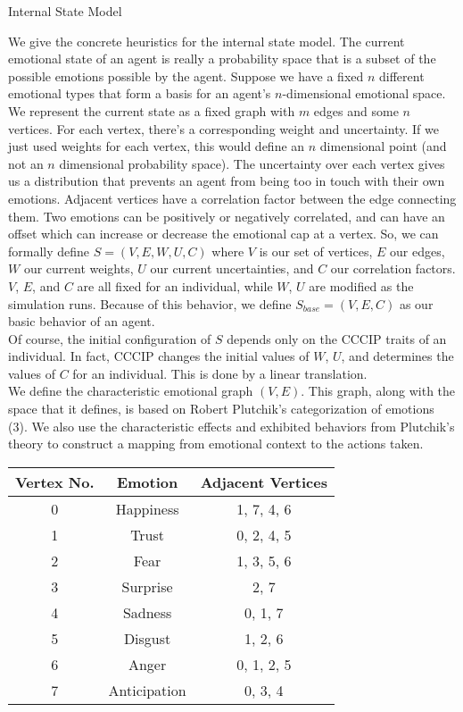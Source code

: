 \documentclass[11pt]{article}
\begin{document}
\begin{section}{Internal State Model}

We give the concrete heuristics for the internal state model. The current emotional state of an agent is really a probability space that is a subset of the possible emotions possible by the agent. Suppose we have a fixed $n$ different emotional types that form a basis for an agent's $n$-dimensional emotional space. We represent the current state as a fixed graph with $m$ edges and some $n$ vertices. For each vertex, there's a corresponding weight and uncertainty. If we just used weights for each vertex, this would define an $n$ dimensional point (and not an $n$ dimensional probability space). The uncertainty over each vertex gives us a distribution that prevents an agent from being too in touch with their own emotions. Adjacent vertices have a correlation factor between the edge connecting them. Two emotions can be positively or negatively correlated, and can have an offset which can increase or decrease the emotional cap at a vertex. So, we can formally define $S = (V, E, W, U, C)$ where $V$ is our set of vertices, $E$ our edges, $W$ our current weights, $U$ our current uncertainties, and $C$ our correlation factors. $V$, $E$, and $C$ are all fixed for an individual, while $W$, $U$ are modified as the simulation runs. Because of this behavior, we define $S_{base} = (V, E, C)$ as our basic behavior of an agent.\\

Of course, the initial configuration of $S$ depends only on the CCCIP traits of an individual. In fact, CCCIP changes the initial values of $W$, $U$, and determines the values of $C$ for an individual. This is done by a linear translation. \\

We define the characteristic emotional graph $(V, E)$. This graph, along with the space that it defines, is based on Robert Plutchik's categorization of emotions (3). We also use the characteristic effects and exhibited behaviors from Plutchik's theory to construct a mapping from emotional context to the actions taken. \\

\begin{center}
\begin{tabular}{|c|c|c|}
\hline 
Vertex No. & Emotion & Adjacent Vertices \\ 
\hline
0 & Happiness & 1, 7, 4, 6\\ 
\hline
1 & Trust & 0, 2, 4, 5\\
\hline
2 & Fear & 1, 3, 5, 6\\ 
\hline
3 & Surprise & 2, 7\\
\hline
4 & Sadness & 0, 1, 7\\ 
\hline
5 & Disgust & 1, 2, 6\\ 
\hline
6 & Anger & 0, 1, 2, 5\\
\hline
7 & Anticipation & 0, 3, 4\\ 
\hline
\end{tabular}
\end{center}


\end{section}
\end{document}
